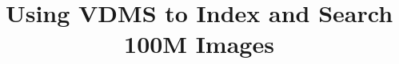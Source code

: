 \documentclass{vldb}
\begin{document}

\title{Using VDMS to Index and Search 100M Images}



%
%
%
%

\end{document}
